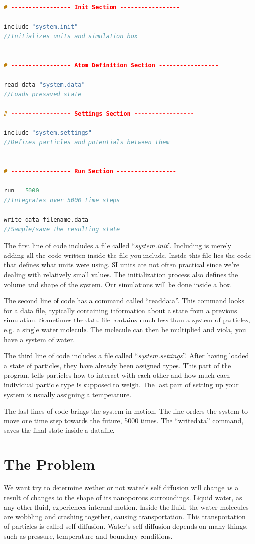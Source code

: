 \documentclass[10pt, a4paper]{report}
\begin{document}
\begin{lstlisting}[language=C++]
# ----------------- Init Section -----------------

include "system.init" 
//Initializes units and simulation box


# ----------------- Atom Definition Section -----------------

read_data "system.data"  
//Loads presaved state

# ----------------- Settings Section -----------------

include "system.settings" 
//Defines particles and potentials between them


# ----------------- Run Section -----------------

run   5000 			
//Integrates over 5000 time steps

write_data filename.data	
//Sample/save the resulting state
\end{lstlisting}
The first line of code includes a file called ``\emph{system.init}''. Including is merely adding all the code written inside the file you include.
Inside this file
lies the code that defines what units were using. SI units are not often practical since we're dealing with relatively small values.
The initialization process also defines the volume and shape of the system. Our simulations will be done inside a box.

The second line of code has a command called ``read\textunderscore data''.
This command looks for a data file, typically containing information about a state from a previous simulation.
Sometimes the data file contains much less than a system of particles, e.g. a single water molecule. The molecule can then be multiplied
and viola, you have a system of water.

The third line of code includes a file called ``\emph{system.settings}''.
After having loaded a state of particles, they have already been assigned types.
This part of the program tells particles how to interact with each other and how much each individual particle type is supposed to weigh.
The last part of setting up your system is usually assigning a temperature.

The last lines of code brings the system in motion. The line orders the system to move one time step towards the future, 5000 times.
The ``write\textunderscore data'' command, saves the final state inside a datafile. 


\chapter{The Problem}
We want try to determine wether or not water's self diffusion will change as a result of changes to the shape of its nanoporous surroundings.
Liquid water, as any other fluid, experiences internal motion. Inside the fluid, the water molecules are wobbling and crashing together, causing
transportation. This transportation of particles is called self diffusion. Water's self diffusion depends on many things, such as pressure, temperature and boundary conditions.
\end{document}

